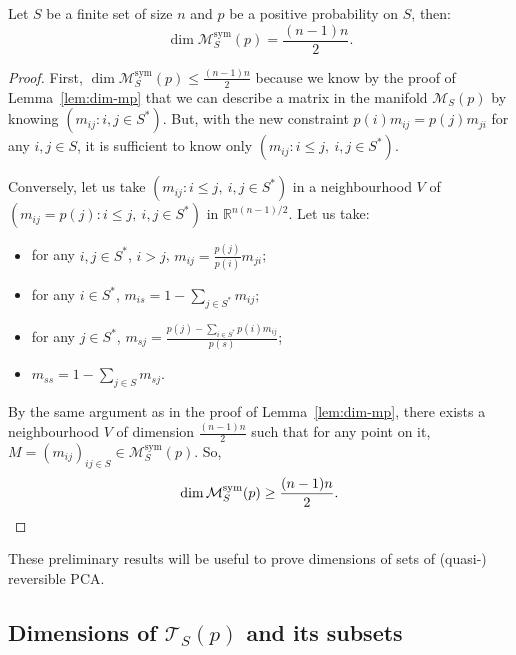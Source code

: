 \documentclass[AHL,Unicode,longabstracts]{cedram}
\newcounter{a}
\newcommand{\triang}[2]{\mathcal{T}_{#1} \left(#2 \right)}
\DeclareMathOperator{\sym}{sym}
\begin{document}
\begin{lemm}\label{lem:div-sym}
Let $S$ be a finite set of size $n$ and $p$ be a positive probability on $S$, then:
\[
\dim \mathcal{M}^{\sym}_S(p) = \frac{(n-1)n}{2}.
\]
\end{lemm}

\begin{proof}
First, $\dim \mathcal{M}^{\sym}_S(p) \leq \frac{(n-1)n}{2}$ because we know by the proof of Lemma~\ref{lem:dim-mp} that we can describe a matrix in the manifold $\mathcal{M}_S(p)$ by knowing $(m_{ij} : i,j \in S^*)$. But, with the new constraint $p(i) m_{ij} = p(j) m_{ji}$ for any $i,j \in S$, it is sufficient to know only $(m_{ij} : i \leq j,\ i,j \in S^*)$.

Conversely, let us take $(m_{ij} : i \leq j,\ i,j \in S^*)$ in a neighbourhood $V$ of \linebreak$(m_{ij}= p(j) : i \leq j,\ i,j \in S^*)$ in $\mathbb{R}^{n(n-1)/2}$. Let us take:
\begin{itemize}
\item for any $i,j \in S^*$, $i>j$, $m_{ij} =  \frac{p(j)}{p(i)} m_{ji}$;
\item for any $i \in S^*$, $m_{is} = 1 - \sum_{j\in S^*} m_{ij}$;
\item for any $j \in S^*$, $m_{sj} =  \frac{p(j) - \sum_{i \in S^*} p(i) m_{ij}}{p(s)}$;
\item $m_{ss} = 1 - \sum_{j \in S} m_{sj}$.
\end{itemize}
By the same argument as in the proof of Lemma~\ref{lem:dim-mp}, there exists a neighbourhood $V$ of dimension $\frac{(n-1)n}{2}$ such that for any point on it, $M = (m_{ij})_{ij\in S} \in \mathcal{M}^{\sym}_S(p)$. So,
\[
\dim \mathcal{M}^{\sym}_S(p) \geq \frac{(n-1)n}{2}. \qedhere
\]
\end{proof}

These preliminary results will be useful to prove dimensions of sets of (quasi-) reversible PCA.

\subsection{Dimensions of \texorpdfstring{$\triang{S}{p}$}{triangSp} and its subsets}
\end{document}
